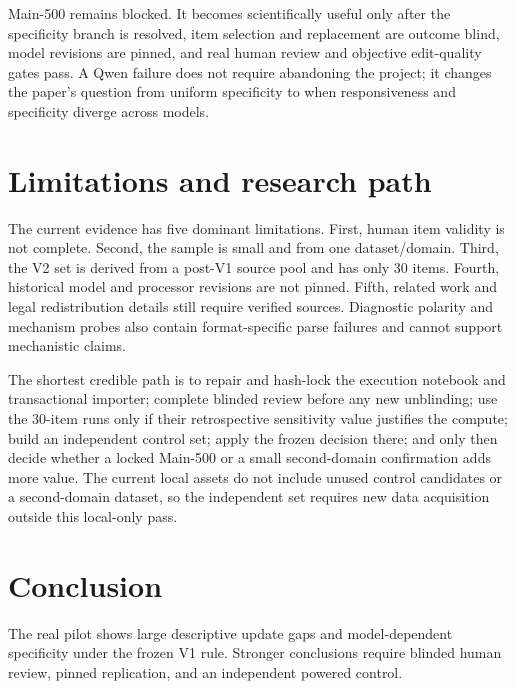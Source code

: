 \documentclass[10pt]{article}
\begin{document}
Main-500 remains blocked. It becomes scientifically useful only after the specificity
branch is resolved, item selection and replacement are outcome blind, model revisions
are pinned, and real human review and objective edit-quality gates pass. A Qwen failure
does not require abandoning the project; it changes the paper's question from uniform
specificity to when responsiveness and specificity diverge across models.

\section{Limitations and research path}

The current evidence has five dominant limitations. First, human item validity is not
complete. Second, the sample is small and from one dataset/domain. Third, the V2 set is
derived from a post-V1 source pool and has only 30 items. Fourth, historical model and
processor revisions are not pinned. Fifth, related work and legal redistribution details
still require verified sources. Diagnostic polarity and mechanism probes also contain
format-specific parse failures and cannot support mechanistic claims.

The shortest credible path is to repair and hash-lock the execution notebook and
transactional importer; complete blinded review before any new unblinding; use the
30-item runs only if their retrospective sensitivity value justifies the compute; build
an independent control set; apply the frozen decision there; and only then decide whether
a locked Main-500 or a small second-domain confirmation adds more value. The current
local assets do not include unused control candidates or a second-domain dataset, so the
independent set requires new data acquisition outside this local-only pass.

\section{Conclusion}

The real pilot shows large descriptive update gaps and model-dependent specificity under
the frozen V1 rule. Stronger conclusions require blinded human review, pinned replication,
and an independent powered control.
\end{document}
